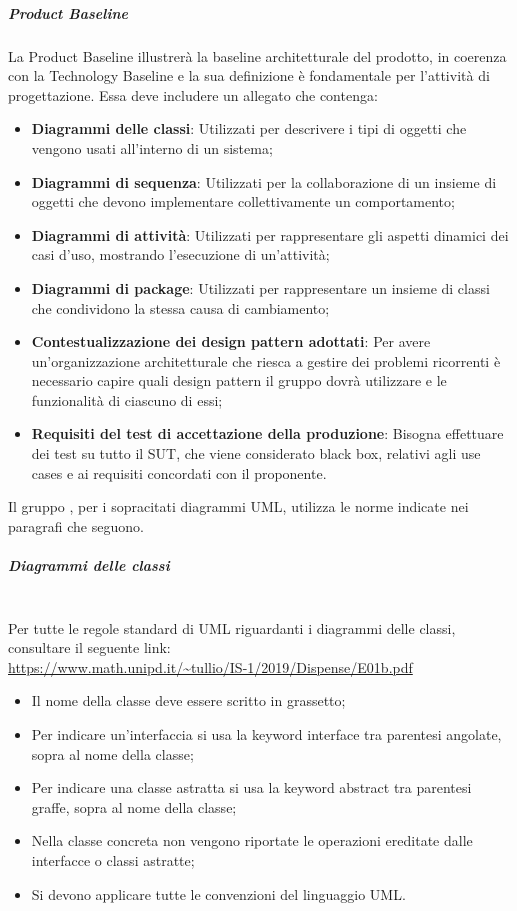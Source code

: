 \subparagraph*{Product Baseline}
La Product Baseline illustrerà la baseline architetturale del prodotto, in coerenza con la Technology Baseline e la sua definizione è fondamentale per l'attività di progettazione.
Essa deve includere un allegato che contenga:
\begin{itemize}
	\item \textbf{Diagrammi delle classi}: Utilizzati per descrivere i tipi di oggetti che vengono usati all'interno di un sistema;
	\item \textbf{Diagrammi di sequenza}: Utilizzati per la collaborazione di un insieme di oggetti che devono implementare collettivamente un comportamento;
	\item \textbf{Diagrammi di attività}: Utilizzati per rappresentare gli aspetti dinamici dei casi d'uso, mostrando l'esecuzione di un'attività;
	\item \textbf{Diagrammi di package}: Utilizzati per rappresentare un insieme di classi che condividono la stessa causa di cambiamento;
	\item \textbf{Contestualizzazione dei design pattern adottati}: Per avere un'organizzazione architetturale che riesca a gestire dei problemi ricorrenti è necessario capire quali design pattern il gruppo dovrà utilizzare e le funzionalità di ciascuno di essi;	
	\item \textbf{Requisiti del test di accettazione della produzione}: Bisogna effettuare dei test su tutto il SUT, che viene considerato black box, relativi agli use cases e ai requisiti concordati con il proponente.
\end{itemize}

Il gruppo \Gruppo{}, per i sopracitati diagrammi UML, utilizza le norme indicate nei paragrafi che seguono.
 
\subparagraph*{Diagrammi delle classi}\mbox{}\\
Per tutte le regole standard di UML riguardanti i diagrammi delle classi, consultare il seguente link:
\\
 \url{https://www.math.unipd.it/~tullio/IS-1/2019/Dispense/E01b.pdf}
\begin{itemize}
	\item Il nome della classe deve essere scritto in grassetto;
	\item Per indicare un'interfaccia si usa la keyword interface tra parentesi angolate, sopra al nome della classe;
	\item Per indicare una classe astratta si usa la keyword abstract tra parentesi graffe, sopra al nome della classe;
	\item Nella classe concreta non vengono riportate le operazioni ereditate dalle interfacce o classi astratte;
	\item Si devono applicare tutte le convenzioni del linguaggio UML. 	
\end{itemize}

